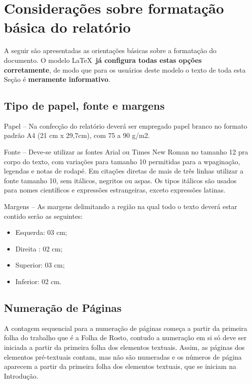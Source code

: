 \section{Considerações sobre formatação básica do relatório}

A seguir são apresentadas as orientações básicas sobre a formatação do
documento. O modelo \LaTeX\ \textbf{já configura todas estas opções
	corretamente}, de modo que para os usuários deste modelo o texto de toda esta
Seção é \textbf{meramente informativo}.

\subsection{Tipo de papel, fonte e margens}

Papel -- Na confecção do relatório deverá ser empregado papel branco no formato
padrão A4 (21 cm x 29,7cm), com 75 a 90 g/m2.

Fonte -- Deve-se utilizar as fontes Arial ou Times New Roman no tamanho 12 pra
corpo do texto, com variações para tamanho 10 permitidas para a wpaginação,
legendas e notas de rodapé. Em citações diretas de mais de três linhas utilizar
a fonte tamanho 10, sem itálicos, negritos ou aspas. Os tipos itálicos são
usados para nomes científicos e expressões estrangeiras, exceto expressões
latinas.

Margens -- As margens delimitando a região na qual todo o texto deverá estar
contido serão as seguintes:

\begin{itemize}
	\item Esquerda: 03 cm;
	\item Direita : 02 cm;
	\item Superior: 03 cm;
	\item Inferior: 02 cm.
\end{itemize}

\subsection{Numeração de Páginas}

A contagem sequencial para a numeração de páginas começa a partir da primeira
folha do trabalho que é a Folha de Rosto, contudo a numeração em si só deve ser
iniciada a partir da primeira folha dos elementos textuais. Assim, as páginas
dos elementos pré-textuais contam, mas não são numeradas e os números de página
aparecem a partir da primeira folha dos elementos textuais, que se iniciam na
Introdução.

